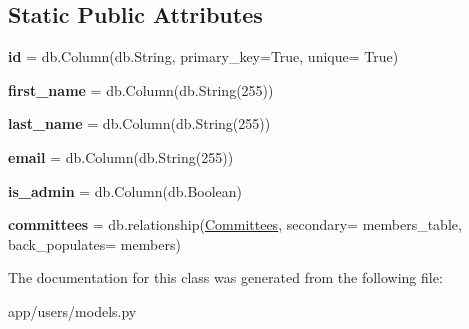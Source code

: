 \subsection*{Static Public Attributes}
\begin{DoxyCompactItemize}
\item 
\mbox{\label{classapp_1_1users_1_1models_1_1_users_aa414198ce22897dcc0cb164e1e630f2e}} 
{\bfseries id} = db.\+Column(db.\+String, primary\+\_\+key=True, unique= True)
\item 
\mbox{\label{classapp_1_1users_1_1models_1_1_users_a8a38223ace2166e20b7a1bbbd5d2fc16}} 
{\bfseries first\+\_\+name} = db.\+Column(db.\+String(255))
\item 
\mbox{\label{classapp_1_1users_1_1models_1_1_users_ab8b402194d4ae9decb5e5a1f7afb7c86}} 
{\bfseries last\+\_\+name} = db.\+Column(db.\+String(255))
\item 
\mbox{\label{classapp_1_1users_1_1models_1_1_users_a44d0472206bce2b5904fa1263f4c0349}} 
{\bfseries email} = db.\+Column(db.\+String(255))
\item 
\mbox{\label{classapp_1_1users_1_1models_1_1_users_aea04a132efcb104036de3ed2e33172fc}} 
{\bfseries is\+\_\+admin} = db.\+Column(db.\+Boolean)
\item 
\mbox{\label{classapp_1_1users_1_1models_1_1_users_a1fbbe2145bdfa8ec81cdf8ebc270514b}} 
{\bfseries committees} = db.\+relationship(\textquotesingle{}\mbox{\hyperlink{classapp_1_1committees_1_1models_1_1_committees}{Committees}}\textquotesingle{}, secondary= members\+\_\+table, back\+\_\+populates= \textquotesingle{}members\textquotesingle{})
\end{DoxyCompactItemize}


The documentation for this class was generated from the following file\+:\begin{DoxyCompactItemize}
\item 
app/users/models.\+py\end{DoxyCompactItemize}
